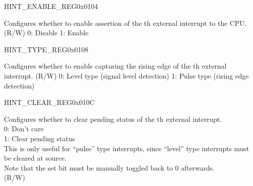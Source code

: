 \begin{register}{H}{INT\_ENABLE\_REG}{0x0104}\label{regdesc:INTENABLEREG}
%
%
%
%
%
%
\regnewline%
\begin{regdesc}
\begin{reglist}
\item [INT\_ENABLE\lbrack\regindex{n}\rbrack] Configures whether to enable assertion of the th external interrupt to the CPU. (R/W)
0: Disable
1: Enable
\end{reglist}
\end{regdesc}
\end{register}

\begin{register}{H}{INT\_TYPE\_REG}{0x0108}\label{regdesc:INTTYPEREG}
%
%
%
%
%
%
\regnewline%
\begin{regdesc}
\begin{reglist}
\item [INT\_TYPE\lbrack\regindex{n}\rbrack] Configures whether to enable capturing the rising edge of the th external interrupt. (R/W)
0: Level type (signal level detection)
1: Pulse type (rising edge detection)
\end{reglist}
\end{regdesc}
\end{register}

\begin{register}{H}{INT\_CLEAR\_REG}{0x010C}\label{regdesc:INTCLEARREG}
%
%
%
%
%
%
\regnewline%
\begin{regdesc}
\begin{reglist}
\item [INT\_CLEAR\lbrack\regindex{n}\rbrack] Configures whether to clear pending status of the th external interrupt.\\
0: Don't care\\
1: Clear pending status\\
This is only useful for “pulse” type interrupts, since “level” type interrupts must be cleared at source. \\
Note that the set bit must be manually toggled back to 0 afterwards.\\
(R/W)
\end{reglist}
\end{regdesc}
\end{register}

